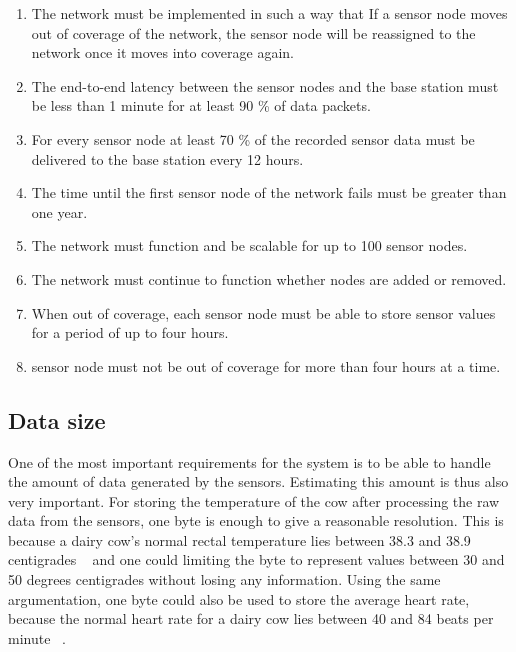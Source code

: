 \documentclass[conference]{IEEEtran}
\begin{document}
\begin{enumerate} 

    \item The network must be implemented in such a way that If a sensor node
        moves out of coverage of the network, the sensor node will be
        reassigned to the network once it moves into coverage again.  
        
    \item The end-to-end latency between the sensor nodes and the base station
        must be less than 1 minute for at least 90 \% of data packets.
        
    \item For every sensor node at least 70 \% of the recorded sensor data must
        be delivered to the base station every 12 hours.
        
    \item The time until the first sensor node of the network fails must be
        greater than one year.  
        
    \item The network must function and be scalable for up to 100 sensor nodes.
        
    \item The network must continue to function whether nodes are added or
        removed.
    
    \item When out of coverage, each sensor node must be able to store sensor
        values for a period of up to four hours.
    
    \item  sensor node must not be out of coverage for more than four hours at
        a time.

\end{enumerate}


\subsection{Data size}

One of the most important requirements for the system is to be able to handle
the amount of data generated by the sensors. Estimating this amount is thus
also very important. For storing the temperature of the cow after processing
the raw data from the sensors, one byte is enough to give a reasonable
resolution. This is because a dairy cow’s normal rectal temperature lies
between 38.3 and 38.9 centigrades ~\cite{wiki_bov} and one could limiting the
byte to represent values between 30 and 50 degrees centigrades without losing
any information.  Using the same argumentation, one byte could also be used to
store the average heart rate, because the normal heart rate for a dairy cow
lies between 40 and 84 beats per minute ~\cite{wiki_bov}.
\end{document}
